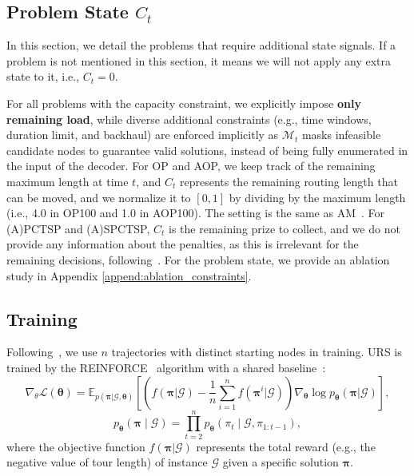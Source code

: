 \documentclass{article}
\theoremstyle{plain}
\theoremstyle{definition}
\theoremstyle{remark}
\begin{document}
\subsection{Problem State $C_{t}$}
\label{append:problem_state}
In this section, we detail the problems that require additional state signals. If a problem is not mentioned in this section, it means we will not apply any extra state to it, i.e., $C_{t}=0$. 

For all problems with the capacity constraint, we explicitly impose \textbf{only remaining load}, while diverse additional constraints (e.g., time windows, duration limit, and backhaul) are enforced implicitly as $\mathcal{M}_t$ masks infeasible candidate nodes to guarantee valid solutions, instead of being fully enumerated in the input of the decoder. For OP and AOP, we keep track of the remaining maximum length at time $t$, and $C_t$ represents the remaining routing length that can be moved, and we normalize it to $[0,1]$ by dividing by the maximum length (i.e., 4.0 in OP100 and 1.0 in AOP100). The setting is the same as AM~\citep{kool2019attention}. For (A)PCTSP and (A)SPCTSP, $C_t$ is the remaining prize to collect, and we do not provide any information about the penalties, as this is irrelevant for the remaining decisions, following~\citet{kool2019attention}. For the problem state, we provide an ablation study in Appendix \ref{append:ablation_constraints}.

\subsection{Training}
\label{append:training}

Following~\citet{kwon2020pomo}, we use $n$ trajectories with distinct starting nodes in training. URS is trained by the REINFORCE~\citep{williams1992reinforce} algorithm with a shared baseline~\citep{kwon2020pomo}:
\begin{equation}
    \nabla_\theta \mathcal{L} (\bm{\theta}) = \mathbb{E}_{p(\bm{\pi}| \mathcal{G},{\bm{\theta}})}[ 
    (f(\bm{\pi} | \mathcal{G})-\frac{1}{n} \sum_{i=1}^n f(\bm{\pi}^{i} | \mathcal{G}))
    \nabla_{\bm{\theta}} \log p_{\bm{\theta}}\left(\bm{\pi} | \mathcal{G}\right) ],
    \label{eq:mean_loss}
\end{equation}
\begin{equation}
    p_{\bm{\theta}}(\bm{\pi}\mid \mathcal{G})=\prod_{t=2}^{n}
    p_{\bm{\theta}}(\pi_t\mid \mathcal{G},\pi_{1:t-1}),
    \label{eq:construct_solution}
\end{equation}
where the objective function $f(\bm{\pi} | \mathcal{G})$ represents the total reward (e.g., the negative value of tour length) of instance $\mathcal{G}$ given a specific solution $\bm{\pi}$.
\end{document}
